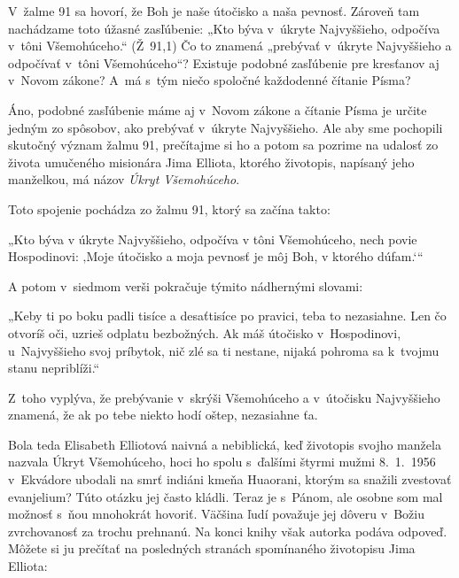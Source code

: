 \def\velkostpisma{10}
\def\velkostriadku{12.5}




V~žalme 91 sa hovorí, že Boh je naše útočisko a naša pevnosť. Zároveň tam nachádzame toto úžasné zasľúbenie: „Kto býva v~úkryte Najvyššieho, odpočíva v~tôni Všemohúceho.“ (Ž~91,1) Čo to znamená „prebývať v~úkryte Najvyššieho a odpočívať v~tôni Všemohúceho“? Existuje podobné zasľúbenie pre kresťanov aj v~Novom zákone? A~má s~tým niečo spoločné každodenné čítanie Písma?

Áno, podobné zasľúbenie máme aj v~Novom zákone a čítanie Písma je určite jedným zo spôsobov, ako prebývať v~úkryte Najvyššieho. Ale aby sme pochopili skutočný význam žalmu 91, prečítajme si ho a potom sa pozrime na udalosť zo života umučeného misionára Jima Elliota, ktorého životopis, napísaný jeho manželkou, má názov {\em Úkryt Všemohúceho}.


Toto spojenie pochádza zo žalmu 91, ktorý sa začína takto:

„Kto býva v úkryte Najvyššieho, odpočíva v tôni Všemohúceho, nech povie Hospodinovi: ‚Moje útočisko a moja pevnosť je môj Boh, v ktorého dúfam.‘“

A potom v~siedmom verši pokračuje týmito nádhernými slovami:

„Keby ti po boku padli tisíce a desaťtisíce po pravici, teba to nezasiahne.
Len čo otvoríš oči, uzrieš odplatu bezbožných. Ak máš útočisko v~Hospodinovi, u~Najvyššieho svoj príbytok, nič zlé sa ti nestane, nijaká pohroma sa k~tvojmu stanu nepriblíži.“

Z~toho vyplýva, že prebývanie v~skrýši Všemohúceho a v~útočisku Najvyššieho znamená, že ak po tebe niekto hodí oštep, nezasiahne ťa.


Bola teda Elisabeth Elliotová naivná a nebiblická, keď životopis svojho manžela nazvala Úkryt Všemohúceho, hoci ho spolu s~ďalšími štyrmi mužmi 8.~1.~1956 v~Ekvádore ubodali na smrť indiáni kmeňa Huaorani, ktorým sa snažili zvestovať evanjelium? Túto otázku jej často kládli. Teraz je s~Pánom, ale osobne som mal možnosť s~ňou mnohokrát hovoriť. Väčšina ľudí považuje jej dôveru v~Božiu zvrchovanosť za trochu prehnanú. Na konci knihy však autorka podáva odpoveď. Môžete si ju prečítať na posledných stranách spomínaného životopisu Jima Elliota:


